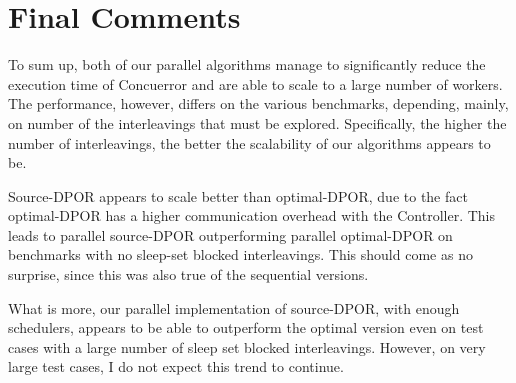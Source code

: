 \section{Final Comments}

To sum up, both of our parallel algorithms manage to significantly reduce the execution time of Concuerror and are able to scale to a large number of workers. The performance, however,
differs on the various benchmarks, depending, mainly, on number of the interleavings that must be explored. Specifically, the higher the number of interleavings, the better the scalability of our algorithms appears to be.

Source-DPOR appears to scale better than optimal-DPOR, due to the fact optimal-DPOR has a higher communication overhead with the Controller. This leads to parallel source-DPOR outperforming parallel optimal-DPOR on benchmarks with no sleep-set blocked interleavings. This should come as no surprise, since this was also true of the sequential versions. 

What is more, our parallel implementation of source-DPOR, with enough schedulers, appears to be able to outperform the optimal version even on test cases with a large number of sleep set blocked interleavings. However, on very large test cases, I do not expect this trend to continue.
